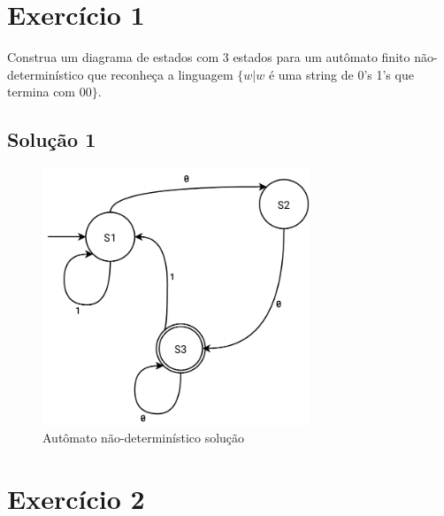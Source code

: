 \documentclass[a4paper, 12pt]{article}
\begin{document}
\newpage
\tableofcontents
\thispagestyle{empty}

\newpage
{}

\newpage
\section*{Exercício 1}

Construa um diagrama de estados com 3 estados para um autômato finito
não-determinístico que reconheça a linguagem $\{ w | w$  é uma string de 0’s 1’s
que termina com $00\}$.

\subsection*{Solução 1}

\begin{figure}[!ht]
    \centering
    \includegraphics[width=8cm]{./imgs/task-2-1.pdf}
    \caption{Autômato não-determinístico solução}
    \label{fig:solution_t2_1}
\end{figure}


\newpage
\section*{Exercício 2}
\end{document}
